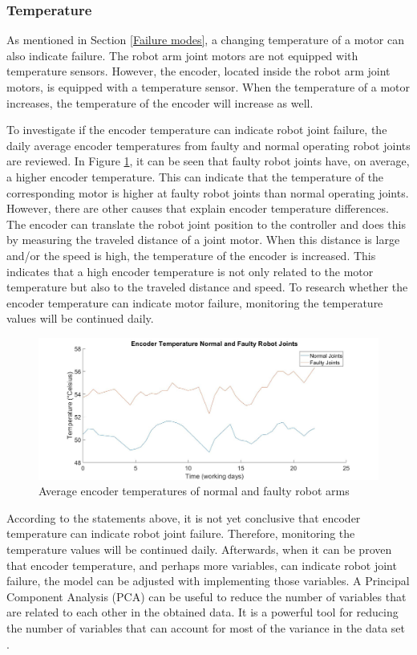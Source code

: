 \subsubsection{Temperature} \label{Temperature}
As mentioned in Section \ref{Failure modes}, a changing temperature of a motor can also indicate failure. The robot arm joint motors are not equipped with temperature sensors. However, the encoder, located inside the robot arm joint motors, is equipped with a temperature sensor. When the temperature of a motor increases, the temperature of the encoder will increase as well.

To investigate if the encoder temperature can indicate robot joint failure, the daily average encoder temperatures from faulty and normal operating robot joints are reviewed. In Figure \ref{fig:AvgEncTemp}, it can be seen that faulty robot joints have, on average, a higher encoder temperature. This can indicate that the temperature of the corresponding motor is higher at faulty robot joints than normal operating joints. However, there are other causes that explain encoder temperature differences. The encoder can translate the robot joint position to the controller and does this by measuring the traveled distance of a joint motor. When this distance is large and/or the speed is high, the temperature of the encoder is increased. This indicates that a high encoder temperature is not only related to the motor temperature but also to the traveled distance and speed. To research whether the encoder temperature can indicate motor failure, monitoring the temperature values will be continued daily. 
\begin{figure}[ht]
\centering
\includegraphics[width=\textwidth]{Figures/EncTemperatures}
\caption[Average encoder temperatures of normal and faulty robot arms]{Average encoder temperatures of normal and faulty robot arms} \label{fig:AvgEncTemp}
\end{figure}

According to the statements above, it is not yet conclusive that encoder temperature can indicate robot joint failure. Therefore, monitoring the temperature values will be continued daily. Afterwards, when it can be proven that encoder temperature, and perhaps more variables, can indicate robot joint failure, the model can be adjusted with implementing those variables. A Principal Component Analysis (PCA) can be useful to reduce the number of variables that are related to each other in the obtained data. It is a powerful tool for reducing the number of variables that can account for most of the variance in the data set \parencite{Virk2012}.

